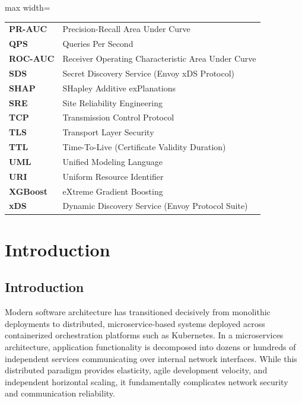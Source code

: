 \documentclass[12pt,a4paper]{report}
\begin{document}
\begin{adjustbox}{max width=\textwidth}
\begin{tabular}{p{3.2cm}p{11cm}}
\textbf{PR-AUC} & Precision-Recall Area Under Curve \\
\textbf{QPS} & Queries Per Second \\
\textbf{ROC-AUC} & Receiver Operating Characteristic Area Under Curve \\
\textbf{SDS} & Secret Discovery Service (Envoy xDS Protocol) \\
\textbf{SHAP} & SHapley Additive exPlanations \\
\textbf{SRE} & Site Reliability Engineering \\
\textbf{TCP} & Transmission Control Protocol \\
\textbf{TLS} & Transport Layer Security \\
\textbf{TTL} & Time-To-Live (Certificate Validity Duration) \\
\textbf{UML} & Unified Modeling Language \\
\textbf{URI} & Uniform Resource Identifier \\
\textbf{XGBoost} & eXtreme Gradient Boosting \\
\textbf{xDS} & Dynamic Discovery Service (Envoy Protocol Suite) \\
\end{tabular}
\end{adjustbox}

\clearpage

\pagestyle{main}

\chapter{Introduction}

\section{Introduction}
Modern software architecture has transitioned decisively from monolithic deployments to distributed, microservice-based systems deployed across containerized orchestration platforms such as Kubernetes. In a microservices architecture, application functionality is decomposed into dozens or hundreds of independent services communicating over internal network interfaces. While this distributed paradigm provides elasticity, agile development velocity, and independent horizontal scaling, it fundamentally complicates network security and communication reliability.
\end{document}
